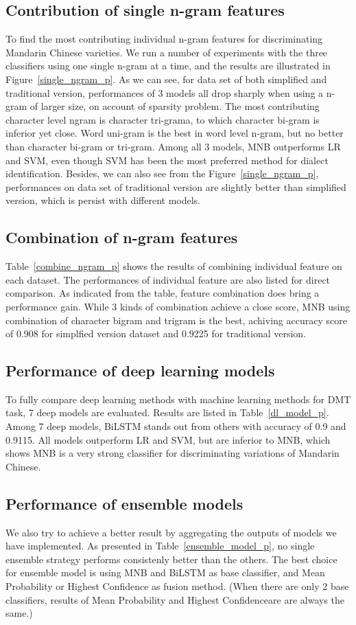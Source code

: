 \documentclass[11pt,a4paper]{article}
\begin{document}
\subsection{Contribution of single n-gram features}
To find the most contributing individual n-gram features for discriminating Mandarin Chinese varieties. We run a number of experiments with the three classifiers using one single n-gram at a time, and the results are illustrated  in Figure~\ref{single_ngram_p}. As we can see, for data set of both simplified and traditional version, performances of 3 models all drop sharply when using a n-gram of larger size, on account of sparsity problem. The most contributing character level ngram is character tri-grama, to which character bi-gram is inferior yet close. Word uni-gram is the best in word level n-gram, but no better than character bi-gram or tri-gram. Among all 3 models, MNB outperforms LR and SVM, even though SVM has been the most preferred method for dialect identification. Besides, we can also see from the Figure~\ref{single_ngram_p}, performances on data set of traditional version are slightly better than simplified version, which is persist with different models.

\subsection{Combination of n-gram features}
Table~\ref{combine_ngram_p} shows the results of combining individual feature on each dataset. The performances of individual feature are also listed for direct comparison. As indicated from the table, feature combination does bring a performance gain. While 3 kinds of combination achieve a close score, MNB using combination of character bigram and trigram is the best, achiving accuracy score of 0.908 for simplfied version dataset and 0.9225 for traditional version.

\subsection{Performance of deep learning models}
To fully compare deep learning methods with machine learning methods for DMT task, 7 deep models are evaluated. Results are listed in Table~\ref{dl_model_p}. Among 7 deep models, BiLSTM stands out from others with accuracy of 0.9 and 0.9115. All models outperform LR and SVM, but are inferior to MNB, which shows MNB is a very strong classifier for discriminating variations of Mandarin Chinese.

\subsection{Performance of ensemble models}
We also try to achieve a better result by aggregating the outputs of models we have implemented. As presented in Table~\ref{ensemble_model_p}, no single ensemble strategy performs consistenly better than the others. The best choice for ensemble model is using MNB and BiLSTM as base classifier, and Mean Probability or Highest Confidence as fusion method. (When there are only 2 base classifiers, results of Mean Probability and Highest Confidenceare are always the same.)
\end{document}
